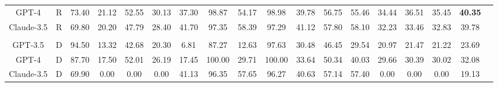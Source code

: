 \documentclass{article} %
\begin{document}
\begin{table}[htb!]
{\begin{tabular}{ccc*{15}c}
GPT-4 & R & 73.40 & 21.12 & 52.55 & 30.13 & 37.30 & 98.87 & 54.17 & 98.98 & 39.78 & 56.75 & 55.46 & 34.44 & 36.51 & 35.45 & \bf 40.35 \\
Claude-3.5 & R & 69.80 & 20.20 & 47.79 & 28.40 & 41.70 & 97.35 & 58.39 & 97.29 & 41.12 & 57.80 & 58.10 & 32.23 & 33.46 & 32.83 & 39.78 \\\\
GPT-3.5 & D & 94.50 & 13.32 & 42.68 & 20.30 & 6.81 & 87.27 & 12.63 & 97.63 & 30.48 & 46.45 & 29.54 & 20.97 & 21.47 & 21.22 & 23.69 \\
GPT-4 & D & 87.70 & 17.50 & 52.01 & 26.19 & 17.45 & 100.00 & 29.71 & 100.00 & 33.64 & 50.34 & 40.03 & 29.66 & 30.39 & 30.02 & 32.08 \\
Claude-3.5 & D & 69.90 & 0.00 & 0.00 & 0.00 & 41.13 & 96.35 & 57.65 & 96.27 & 40.63 & 57.14 & 57.40 & 0.00 & 0.00 & 0.00 & 19.13 \\

\bottomrule
\end{tabular}
}

\end{table}
\end{document}
